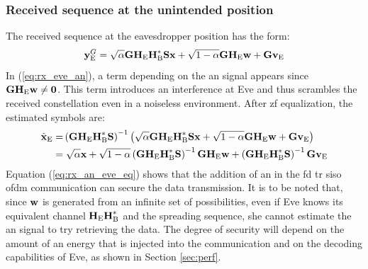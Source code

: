 \subsubsection{Received sequence at the unintended position}
The received sequence at the eavesdropper position has the form:
\begin{equation}
    \textbf{y}_{\text{E}}^G = \sqrt{\alpha}  \textbf{G} \textbf{H}_{\text{E}} \textbf{H}_{\text{B}}^* \textbf{S}\textbf{x} + \sqrt{1-\alpha} \textbf{G} \textbf{H}_{\text{E}} \textbf{w} + \textbf{G}  \textbf{v}_\text{E}
    \label{eq:rx_eve_an}
\end{equation}
In (\ref{eq:rx_eve_an}), a term depending on the \gls{an} signal appears since $\textbf{G}\textbf{H}_{\text{E}} \textbf{w} \neq \textbf{0}$. This term introduces an interference at Eve and thus scrambles the received constellation even in a noiseless environment. After \gls{zf} equalization, the estimated symbols are:
\begin{equation}
    \begin{split}
         \hat{\textbf{x}}_{\text{E}} =& \left(\textbf{G} \textbf{H}_{\text{E}} \textbf{H}_{\text{B}}^* \textbf{S} \right)^{-1}
         \left( \sqrt{\alpha} \textbf{G} \textbf{H}_{\text{E}} \textbf{H}_{\text{B}}^* \textbf{S} \textbf{x} +   \sqrt{1-\alpha} \textbf{G} \textbf{H}_{\text{E}} \textbf{w}  +  \textbf{G}  \textbf{v}_\text{E}  \right) \\
         =& \;\sqrt{\alpha}\textbf{x} + \sqrt{1-\alpha} \left(\textbf{G} \textbf{H}_{\text{E}} \textbf{H}_{\text{B}}^* \textbf{S} \right)^{-1}  \textbf{G} \textbf{H}_{\text{E}} \textbf{w} + \left(\textbf{G} \textbf{H}_{\text{E}} \textbf{H}_{\text{B}}^* \textbf{S} \right)^{-1}  \textbf{G} \textbf{v}_\text{E}
    \end{split}
    \label{eq:rx_an_eve_eq}
\end{equation}
Equation (\ref{eq:rx_an_eve_eq}) shows that the addition of \gls{an} in the \gls{fd} \gls{tr} \gls{siso} \gls{ofdm} communication can secure the data transmission. It is to be noted that, since $\textbf{w}$ is generated from an infinite set of possibilities, even if Eve knows its equivalent channel $\textbf{H}_{\text{E}}\textbf{H}_{\text{B}}^*$ and the spreading sequence, she cannot estimate the \gls{an} signal  to try retrieving the data.  The degree of security will depend on the amount of \gls{an} energy that is injected into the communication and on the decoding capabilities of Eve, as shown in Section \ref{sec:perf}.


